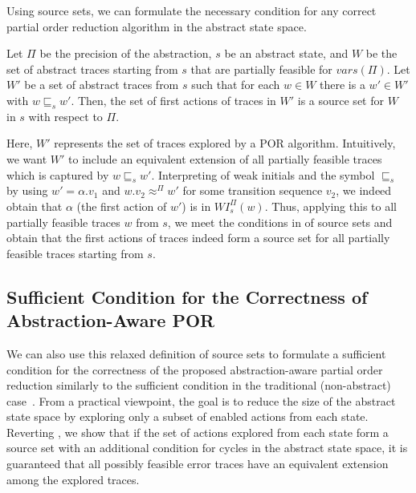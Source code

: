 \documentclass[numbook]{svjour3}
\begin{document}
Using source sets, we can formulate the necessary condition for any correct partial order reduction algorithm in the abstract state space.

\begin{property}
    \label{property:aapor-necessary-condition}
    Let $\Pi$ be the precision of the abstraction, $s$ be an abstract state, and $W$ be the set of abstract traces starting from $s$ that are partially feasible for $\mathit{vars}(\Pi)$. Let $W'$ be a set of abstract traces from $s$ such that for each $w \in W$ there is a $w' \in W'$ with $w \sqsubseteq_{s} w'$. Then, the set of first actions of traces in $W'$ is a source set for $W$ in $s$ with respect to $\Pi$.
\end{property}

Here, $W'$ represents the set of traces explored by a POR algorithm. Intuitively, we want $W'$ to include an equivalent extension of all partially feasible traces which is captured by $w \sqsubseteq_s w'$. Interpreting  of weak initials and the symbol $\sqsubseteq_s$ by using $w' = \alpha.v_1$ and $w.v_2 \approx^\Pi w'$ for some transition sequence $v_2$, we indeed obtain that $\alpha$ (the first action of $w'$) is in $\mathit{WI}_s^\Pi(w)$. Thus, applying this to all partially feasible traces $w$ from $s$, we meet the conditions in  of source sets and obtain that the first actions of traces indeed form a source set for all partially feasible traces starting from $s$.

\subsection{Sufficient Condition for the Correctness of Abstraction-Aware POR}
\label{sec:aapor-sufficient}

We can also use this relaxed definition of source sets to formulate a sufficient condition for the correctness of the proposed abstraction-aware partial order reduction similarly to the sufficient condition in the traditional (non-abstract) case~\cite{source_set_foundation}. From a practical viewpoint, the goal is to reduce the size of the abstract state space by exploring only a subset of enabled actions from each state. Reverting , we show that if the set of actions explored from each state form a source set with an additional condition for cycles in the abstract state space, it is guaranteed that all possibly feasible error traces have an equivalent extension among the explored traces.
\end{document}
